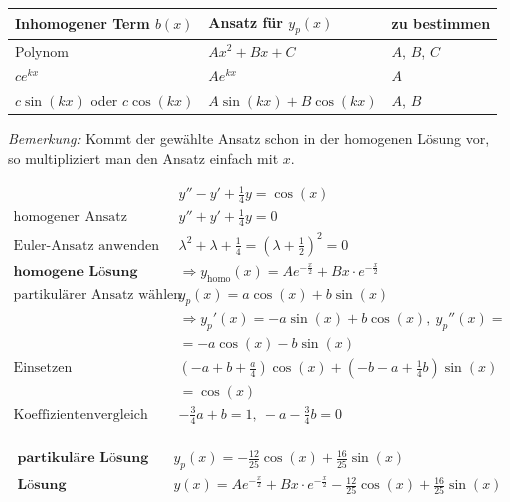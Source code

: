 \begin{table}[H]
	\centering
	\begin{tabular}{|l|l|l|}
		\hline
		\textbf{Inhomogener Term $b(x)$} & \textbf{Ansatz f{\"u}r $y_p(x)$}	& \textbf{zu bestimmen}		\\ \hline
		Polynom				& $Ax^2 + Bx + C$			& $A$, $B$, $C$		\\ \hline
		$c e^{k x}$ & $Ae^{kx}$					& $A$				\\ \hline
		$c\sin(kx)$ oder $c\cos(kx)$ & $A\sin(kx) + B\cos(kx)$ & $A$, $B$ \\ \hline
		
	\end{tabular}
\end{table}

\emph{Bemerkung:} Kommt der gew{\"a}hlte Ansatz schon in der homogenen L{\"o}sung vor,\\ so multipliziert man den Ansatz einfach mit $x$.

\begin{equation*}
\begin{split}
& y'' - y' + \frac{1}{4}y = \cos(x) \\
\text{homogener Ansatz}\quad & y'' + y' + \frac{1}{4}y = 0 \\
\text{Euler-Ansatz anwenden}\quad & \lambda^2 + \lambda + \frac{1}{4} = (\lambda + \frac{1}{2})^2 = 0 \\
\textbf{homogene L{\"o}sung}\quad &\Rightarrow y_\text{homo}(x) = Ae^{-\frac{x}{2}} + Bx \cdot e^{-\frac{x}{2}} \\
\text{partikul{\"a}rer Ansatz w{\"a}hlen}\quad & y_p(x) = a\cos(x) + b\sin(x) \\
& \Rightarrow y_p'(x) = -a\sin(x) + b\cos(x),\  y_p''(x) = \\ & = -a\cos(x) -b \sin(x) \\
\text{Einsetzen}\quad & (-a + b + \frac{a}{4})\cos(x) + (-b -a + \frac{1}{4}b)\sin(x) \\&= \cos(x) \\
\text{Koeffizientenvergleich}\quad & -\frac{3}{4}a + b = 1,\ -a-\frac{3}{4}b = 0 \\
\end{split}
\end{equation*}

\begin{equation*}
\begin{split}
\textbf{partikul{\"a}re L{\"o}sung}\quad & y_p(x) = -\frac{12}{25}\cos(x) + \frac{16}{25}\sin(x) \\
\textbf{L{\"o}sung}\quad & y(x) = Ae^{-\frac{x}{2}} + Bx \cdot e^{-\frac{x}{2}} -\frac{12}{25}\cos(x) + \frac{16}{25}\sin(x)
\end{split}
\end{equation*}

